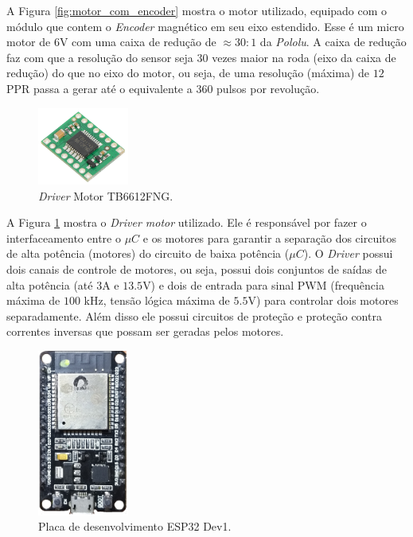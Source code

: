 A Figura \ref{fig:motor_com_encoder} mostra o motor utilizado, equipado com o módulo que contem o \textit{Encoder} magnético em seu eixo estendido. Esse é um micro motor de $6$V com uma caixa de redução de $\approx 30:1$ da \textit{Pololu}\cite{Pololu}. A caixa de redução faz com que a resolução do sensor seja $30$ vezes maior na roda (eixo da caixa de redução) do que no eixo do motor, ou seja, de uma resolução (máxima) de $12$PPR passa a gerar até o equivalente a $360$ pulsos por revolução.\\

\begin{figure}[H]
    \centering
    \includegraphics[width=3cm]{figuras/eletronica/driver.jpg}
    \caption{\textit{Driver} Motor TB6612FNG.}
    \label{fig:driver_motor}
\end{figure}

A Figura \ref{fig:driver_motor} mostra o \emph{Driver motor} utilizado. Ele é responsável por fazer o interfaceamento entre o $\mu{}C$ e os motores para garantir a separação dos circuitos de alta potência (motores) do circuito de baixa potência ($\mu{}C$). O \emph{Driver} possui dois canais de controle de motores, ou seja, possui dois conjuntos de saídas de alta potência (até $3$A e $13.5$V) e dois de entrada para sinal PWM (frequência máxima de $100$ kHz, tensão lógica máxima de $5.5$V) para controlar dois motores separadamente. Além disso ele possui circuitos de proteção e proteção contra correntes inversas que possam ser geradas pelos motores.\\


\begin{figure}[H]
    \centering
    \includegraphics[width=3cm]{figuras/eletronica/esp32_kit.png}
    \caption{Placa de desenvolvimento ESP32 Dev1.}
    \label{fig:esp32_kit}
\end{figure}

